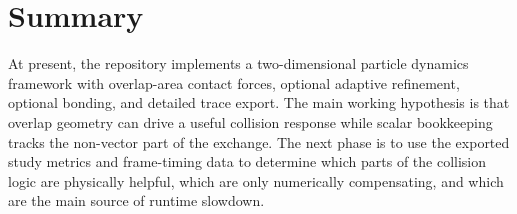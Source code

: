 \documentclass[11pt]{article}
\begin{document}
\section{Summary}
At present, the repository implements a two-dimensional particle dynamics framework with overlap-area contact forces, optional adaptive refinement, optional bonding, and detailed trace export. The main working hypothesis is that overlap geometry can drive a useful collision response while scalar bookkeeping tracks the non-vector part of the exchange. The next phase is to use the exported study metrics and frame-timing data to determine which parts of the collision logic are physically helpful, which are only numerically compensating, and which are the main source of runtime slowdown.
\end{document}
